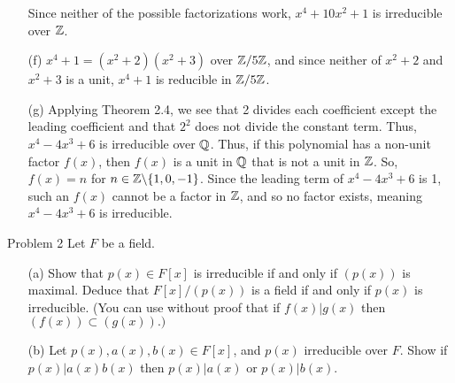 \documentclass{hmwk}
\begin{document}
\begin{solution}
\begin{itemize}
    Since neither of the possible factorizations work, $x^4 + 10x^2 + 1$ is irreducible over $\mathbb{Z}$. 
    
    \item[(f)] $x^4 + 1 = (x^2 + 2)(x^2 + 3)$ over $\mathbb{Z}/5\mathbb{Z}$, and since neither of $x^2 + 2$ and $x^2 + 3$ is a unit, $x^4 + 1$ is reducible in $\mathbb{Z}/5\mathbb{Z}$. 
    
    \item[(g)] Applying Theorem 2.4, we see that 2 divides each coefficient except the leading coefficient and that $2^2$ does not divide the constant term. Thus, $x^4 - 4x^3 + 6$ is irreducible over $\mathbb{Q}$. Thus, if this polynomial has a non-unit factor $f(x)$, then $f(x)$ is a unit in $\mathbb{Q}$ that is not a unit in $\mathbb{Z}$. So, $f(x) = n$ for $n \in \mathbb{Z}\backslash\{1, 0, -1\}$. Since the leading term of $x^4 - 4x^3 + 6$ is 1, such an $f(x)$ cannot be a factor in $\mathbb{Z}$, and so no factor exists, meaning $x^4 - 4x^3 + 6$ is irreducible. 
\end{itemize}
\end{solution}

\begin{problem}{Problem 2}
    Let $F$ be a field.
    \begin{itemize}
        \item[(a)] Show that $p(x) \in F[x]$ is irreducible if and only if $(p(x))$ is maximal. Deduce that $F[x]/(p(x))$ is a field if and only if $p(x)$ is irreducible. (You can use without proof that if $f(x)|g(x)$ then $(f(x)) \subset (g(x)).)$
        \item[(b)] Let $p(x), a(x), b(x) \in F[x]$, and $p(x)$ irreducible over $F$. Show if $p(x)|a(x)b(x)$ then $p(x)|a(x)$ or $p(x)|b(x).$
    \end{itemize}
\end{problem}
\end{document}
